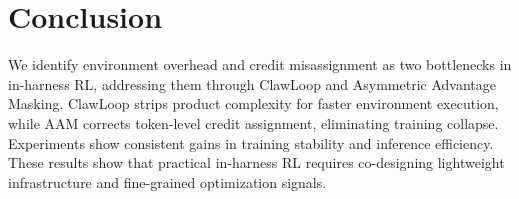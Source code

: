 \documentclass[letterpaper]{article} %
\begin{document}

\section{Conclusion}
We identify environment overhead and credit misassignment as two bottlenecks in in-harness RL, addressing them through ClawLoop and Asymmetric Advantage Masking.
ClawLoop strips product complexity for faster environment execution, while AAM corrects token-level credit assignment, eliminating training collapse.
Experiments show consistent gains in training stability and inference efficiency.
These results show that practical in-harness RL requires co-designing lightweight infrastructure and fine-grained optimization signals.





% 
\end{document}
